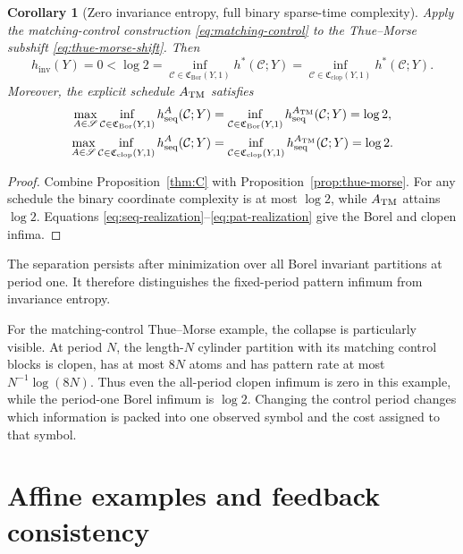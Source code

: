 \documentclass[11pt,reqno]{amsart}
\numberwithin{equation}{section}
\newtheorem{corollary}[theorem]{Corollary}
\theoremstyle{definition}
\theoremstyle{definition}
\newcommand{\C}{\mathcal C}
\newcommand{\hseq}{h_{\mathrm{seq}}}
\newcommand{\hpat}{h^{*}}
\newcommand{\hinv}{h_{\mathrm{inv}}}
\newcommand{\Bor}{\mathrm{Bor}}
\newcommand{\clop}{\mathrm{clop}}
\begin{document}
\begin{corollary}[Zero invariance entropy, full binary sparse-time complexity]
\label{cor:separation}
Apply the matching-control construction \eqref{eq:matching-control} to the
Thue--Morse subshift \eqref{eq:thue-morse-shift}.  Then
\begin{equation}\label{eq:strict-control-separation}
 \hinv(Y)=0
 <\log2
 =\inf_{\C\in\mathfrak C_{\Bor}(Y,1)}\hpat(\C;Y)
 =\inf_{\C\in\mathfrak C_{\clop}(Y,1)}\hpat(\C;Y).
\end{equation}
Moreover, the explicit schedule $A_{\rm TM}$ satisfies
\begin{align}
 \max_{A\in\mathscr S}\inf_{\C\in\mathfrak C_{\Bor}(Y,1)}
 \hseq^A(\C;Y)
 &=\inf_{\C\in\mathfrak C_{\Bor}(Y,1)}\hseq^{A_{\rm TM}}(\C;Y)
 =\log2,
 \label{eq:TM-Borel-sequence}\\
 \max_{A\in\mathscr S}\inf_{\C\in\mathfrak C_{\clop}(Y,1)}
 \hseq^A(\C;Y)
 &=\inf_{\C\in\mathfrak C_{\clop}(Y,1)}\hseq^{A_{\rm TM}}(\C;Y)
 =\log2.
 \label{eq:TM-clopen-sequence}
\end{align}
\end{corollary}

\begin{proof}
Combine Proposition~\ref{thm:C} with Proposition~\ref{prop:thue-morse}.  For any
schedule the binary coordinate complexity is at most $\log2$, while
$A_{\rm TM}$ attains $\log2$.  Equations
\eqref{eq:seq-realization}--\eqref{eq:pat-realization} give the Borel and
clopen infima.
\end{proof}

The separation persists after minimization over all Borel invariant
partitions at period one. It therefore distinguishes the fixed-period
pattern infimum from invariance entropy.


For the matching-control Thue--Morse example, the collapse is particularly
visible. At period $N$, the length-$N$ cylinder partition with its matching
control blocks is clopen, has at most $8N$ atoms and has pattern rate at
most $N^{-1}\log(8N)$. Thus even the all-period clopen infimum is zero
in this example, while the period-one Borel infimum is $\log2$.
Changing the control period changes which information is packed into
one observed symbol and the cost assigned to that symbol.

\section{Affine examples and feedback consistency}\label{sec:affine}
\end{document}
